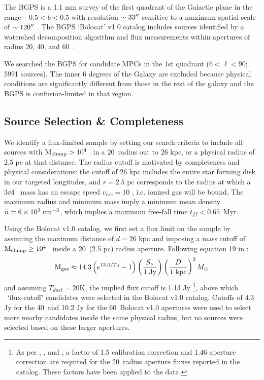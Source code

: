 The BGPS is a 1.1 mm survey of the first quadrant of the Galactic plane in the
range $-0.5 < b < 0.5$ with resolution $\sim33\mbox{$^{\prime\prime}$}$ sensitive to a maximum
spatial scale of $\sim120\mbox{$^{\prime\prime}$}$ \citep{Aguirre2011,Ginsburg2012}.  The BGPS `Bolocat' v1.0 catalog
includes sources identified by a watershed decomposition algorithm and flux
measurements within apertures of radius 20\arcsec, 40\arcsec, and 60\arcsec\
\citep{Rosolowsky2010}.

We searched the BGPS for candidate MPCs in the 1st quadrant ($6 < \ell < 90$;
5991 sources).  The inner 6 degrees of the Galaxy are excluded because physical
conditions are significantly different from those in the rest
of the galaxy  \citep{YusefZadeh2009} and the BGPS is confusion-limited in 
that region.

\subsection{Source Selection \& Completeness}
\label{sec:selection}
We identify a flux-limited sample by setting our search criteria to
include all sources with ${\rm M}_{\rm clump}>10^4$ \msun\ in a 20\arcsec\ radius out to 26 
kpc, or a physical radius of 2.5 pc at that distance.  The radius cutoff is
motivated by completeness and physical considerations: the cutoff of 26 kpc includes
the entire star forming disk in our targeted longitudes, and $r=2.5$ pc corresponds
to the radius at which a $3\ee{4}$ \msun\ mass has an escape speed $v_{esc}=10$ \kms, i.e.
ionized gas will be bound. 
The maximum radius and minimum mass imply a minimum mean density
$\bar{n}=6\times10^3~\textrm{cm}^{-3}$, which implies a maximum free-fall time $t_{ff}<0.65$~Myr.

Using the Bolocat v1.0 catalog, we first set a flux limit on the sample by assuming
the maximum distance of $d=26$ kpc and imposing a mass cutoff of ${\rm M}_{\rm clump}\geq10^4$ \msun\ 
inside a 20\arcsec\ (2.5 pc) radius aperture.  Following equation 19 in
\citet{Aguirre2011}:
\begin{equation} 
    {\rm M}_{\rm gas}\approx 14.3 \left( e^{13.0/T_d}-1 \right)
        \left({S_\nu\over 1\; {\rm Jy}} \right)
        \left(\frac{D}{{\rm 1~kpc}}\right)^{2} M_{\odot} 
\end{equation}   
and assuming $T_{dust}=20$K, the implied flux cutoff is 1.13 Jy \footnote{As
per \citet{Rosolowsky2010}, \citet{Aguirre2011}, and \citet{Ginsburg2012}, a
factor of 1.5 calibration correction and 1.46 aperture correction are required
for the 20\arcsec\ radius aperture fluxes reported in the catalog.  These
factors have been applied to the data. }, above which \nsample\ `flux-cutoff'
candidates were selected in the Bolocat v1.0 catalog.  Cutoffs of 4.3 Jy for
the 40\arcsec\ and 10.2 Jy for the 60\arcsec\ Bolocat v1.0 apertures were used
to select more nearby candidates inside the same physical radius, but no
sources were selected based on these larger apertures.


